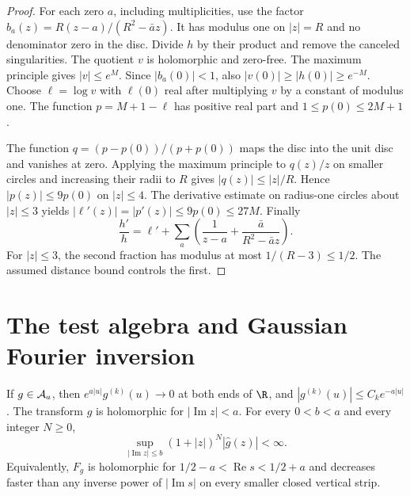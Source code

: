 \begin{proof}
For each zero $a$, including multiplicities, use the factor
$b_a(z)=R(z-a)/(R^2-\bar a z)$.
It has modulus one on $|z|=R$ and no denominator zero in the disc.
Divide $h$ by their product and remove the canceled singularities.
The quotient $v$ is holomorphic and zero-free.
The maximum principle gives $|v|\leq e^M$.
Since $|b_a(0)|<1$, also $|v(0)|\geq|h(0)|\geq e^{-M}$.
Choose $\ell=\log v$ with $\ell(0)$ real after multiplying $v$ by a constant
of modulus one.  The function $p=M+1-\ell$ has positive real part and
$1\leq p(0)\leq2M+1$.

The function $q=(p-p(0))/(p+p(0))$ maps the disc into the unit disc and
vanishes at zero.  Applying the maximum principle to $q(z)/z$ on smaller
circles and increasing their radii to $R$ gives $|q(z)|\leq|z|/R$.
Hence $|p(z)|\leq9p(0)$ on $|z|\leq4$.
The derivative estimate on radius-one circles about $|z|\leq3$ yields
$|\ell'(z)|=|p'(z)|\leq9p(0)\leq27M$.
Finally
\[
 \frac{h'}h=\ell'+\sum_a
 \left(\frac1{z-a}+\frac{\bar a}{R^2-\bar a z}\right).
\]
For $|z|\leq3$, the second fraction has modulus at most $1/(R-3)\leq1/2$.
The assumed distance bound controls the first.
\end{proof}

\section{The test algebra and Gaussian Fourier inversion}
\label{sec:tests}

\begin{lemma}
\label{lem:test-bounds}
If $g\in\mathcal A_a$, then $e^{a|u|}g^{(k)}(u)\to0$ at both ends of $\R$,
and $|g^{(k)}(u)|\leq C_k e^{-a|u|}$.
The transform $\widehat g$ is holomorphic for $|\operatorname{Im}z|<a$.
For every $0<b<a$ and every integer $N\geq0$,
\begin{equation}
 \sup_{|\operatorname{Im}z|\leq b}(1+|z|)^N|\widehat g(z)|<\infty.
 \label{eq:strip-decay}
\end{equation}
Equivalently, $F_g$ is holomorphic for $1/2-a<\operatorname{Re}s<1/2+a$
and decreases faster than any inverse power of $|\operatorname{Im}s|$
on every smaller closed vertical strip.
\end{lemma}

